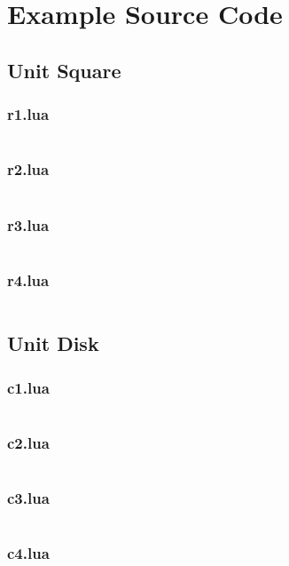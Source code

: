 \documentclass[index.tex]{subfile}
\begin{document}
\newpage
\section{Example Source Code}%
\label{app:example_source_code}

\subsection{Unit Square}%
\label{app:sub:unit_square}

\subsubsection{r1.lua}%
\label{ssub:r1_lua}
\inputminted{lua}{snippets/r1.lua}
\subsubsection{r2.lua}%
\label{ssub:r2_lua}
\inputminted{lua}{snippets/r2.lua}
\subsubsection{r3.lua}%
\label{ssub:r3_lua}
\inputminted{lua}{snippets/r3.lua}
\subsubsection{r4.lua}%
\label{ssub:r4_lua}
\inputminted{lua}{snippets/r4.lua}

\subsection{Unit Disk}%
\label{app:sub:unit_disk}

\subsubsection{c1.lua}%
\label{ssub:c1_lua}
\inputminted{lua}{snippets/c1.lua}
\subsubsection{c2.lua}%
\label{ssub:c2_lua}
\inputminted{lua}{snippets/c2.lua}
\subsubsection{c3.lua}%
\label{ssub:c3_lua}
\inputminted{lua}{snippets/c3.lua}
\subsubsection{c4.lua}%
\label{ssub:c4_lua}
\inputminted{lua}{snippets/c4.lua}
\end{document}
